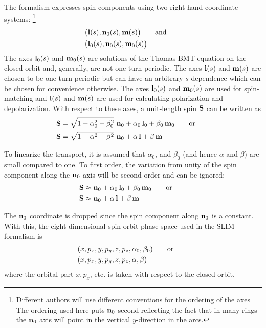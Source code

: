 The  formalism expresses spin components using two right-hand coordinate systems:
\footnote{Different authors will use different conventions for the ordering of the axes
The ordering used here puts ${\bf n}_0$ second reflecting the fact that in many rings the ${\bf n}_0$
axis will point in the vertical $y$-direction in the arcs.}
\begin{align}
  &\big( {\bf l}(s), {\bf n}_0(s), {\bf m}(s) \big)
  \qquad \text{and} \qquad \nonumber \\
  &\big( {\bf l}_0(s), {\bf n}_0(s), {\bf m}_0(s) \big)
\end{align}
The axes ${\bf l}_0(s)$ and ${\bf m}_0(s)$ are solutions of the Thomas-BMT equation on the closed orbit
and, generally, are not one-turn periodic. The axes ${\bf l}(s)$ and ${\bf m}(s)$ are chosen to be
one-turn periodic but can have an arbitrary $s$ dependence which can be chosen for convenience
otherwise. The axes ${\bf l}_0(s)$ and ${\bf m}_0(s)$ are used for spin-matching and ${\bf l}(s)$ and
${\bf m}(s)$ are used for calculating polarization and depolarization.  With respect to these axes, a
unit-length spin ${\bf S}$ can be written as
\begin{align}
  {\bf S} &= \sqrt{1- \alpha_0^2 - \beta_0^2} ~{\bf n}_0 + \alpha_0 \, {\bf l}_0 + \beta_0 \, {\bf m}_0 
  \qquad \text{or} \qquad \nonumber \\
  {\bf S} &= \sqrt{1- \alpha^2 - \beta^2} ~{\bf n}_0 + \alpha \, {\bf l} + \beta \, {\bf m}
  \label{s1ab}
\end{align}

To linearize the transport, it is assumed that $\alpha_0$, and $\beta_0$ (and hence $\alpha$ and
$\beta$) are small compared to one. To first order, the variation from unity of the spin component
along the ${\bf n}_0$ axis will be second order and can be ignored:
\begin{align}
  {\bf S} &\approx {\bf n}_0 + \alpha_0 \, {\bf l}_0 + \beta_0 \, {\bf m}_0
  \qquad \text{or} \qquad \nonumber \\
  {\bf S} &\approx {\bf n}_0 + \alpha \, {\bf l} + \beta \, {\bf m}
\end{align}

The ${\bf n}_0$ coordinate is dropped since the spin component along ${\bf n}_0$ is a constant. With this,
the eight-dimensional spin-orbit phase space used in the SLIM formalism is
\begin{align}
  &(x, p_x, y, p_y, z, p_z, \alpha_0, \beta_0)
  \qquad \text{or} \qquad \nonumber \\
  &(x, p_x, y, p_y, z, p_z, \alpha, \beta)
  \label{xpxypy}
\end{align}
where the orbital part $x, p_x$, etc. is taken with respect to the closed orbit. 

